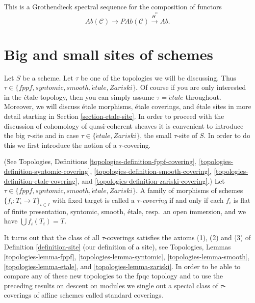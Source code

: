 \begin{remark}
\label{remark-grothendieck-ss}
This is a Grothendieck spectral sequence for the composition of functors
$$
\textit{Ab}(\mathcal{C}) \longrightarrow
\textit{PAb}(\mathcal{C}) \xrightarrow{\check H^0} \textit{Ab}.
$$
\end{remark}








\section{Big and small sites of schemes}
\label{section-big-small}

\noindent
Let $S$ be a scheme.
Let $\tau$ be one of the topologies we will be discussing.
Thus $\tau \in \{fppf, syntomic, smooth, \acute{e}tale, Zariski\}$.
Of course if you are only interested in the \'etale topology, then
you can simply assume $\tau = \acute{e}tale$ throughout. Moreover, we will
discuss \'etale morphisms, \'etale coverings, and \'etale sites
in more detail starting in Section \ref{section-etale-site}.
In order to proceed with the discussion of cohomology of
quasi-coherent sheaves it is convenient to introduce the
big $\tau$-site and in case $\tau \in \{\acute{e}tale, Zariski\}$, the
small $\tau$-site of $S$. In order to do this we first introduce
the notion of a $\tau$-covering.

\begin{definition}
\label{definition-tau-covering}
(See
Topologies, Definitions
\ref{topologies-definition-fppf-covering},
\ref{topologies-definition-syntomic-covering},
\ref{topologies-definition-smooth-covering},
\ref{topologies-definition-etale-covering}, and
\ref{topologies-definition-zariski-covering}.)
Let $\tau \in \{fppf, syntomic, smooth, \acute{e}tale, Zariski\}$.
A family of morphisms of schemes $\{f_i : T_i \to T\}_{i \in I}$ with fixed
target is called a {\it $\tau$-covering} if and only if
each $f_i$ is flat of finite presentation, syntomic, smooth, \'etale,
resp.\ an open immersion, and we have $\bigcup f_i(T_i) = T$.
\end{definition}

\noindent
It turns out that the class of all $\tau$-coverings satisfies the axioms
(1), (2) and (3) of
Definition \ref{definition-site} (our definition of a site), see
Topologies, Lemmas
\ref{topologies-lemma-fppf},
\ref{topologies-lemma-syntomic},
\ref{topologies-lemma-smooth},
\ref{topologies-lemma-etale}, and
\ref{topologies-lemma-zariski}.
In order to be able to compare any of these new topologies to the fpqc topology
and to use the preceding results on descent on modules we single out a special
class of $\tau$-coverings of affine schemes called standard coverings.

